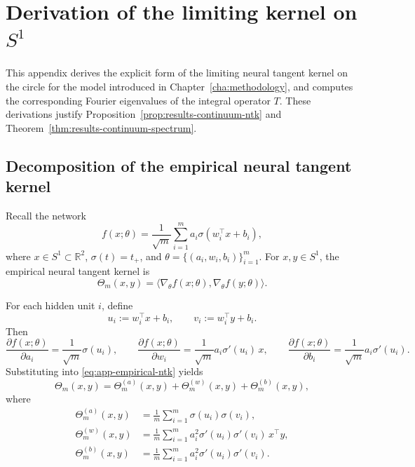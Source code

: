 \chapter{Derivation of the limiting kernel on \(S^1\)}
\label{app:continuum-kernel}

This appendix derives the explicit form of the limiting neural tangent kernel on the circle
for the model introduced in Chapter~\ref{cha:methodology}, and computes the corresponding
Fourier eigenvalues of the integral operator \(T\). These derivations justify
Proposition~\ref{prop:results-continuum-ntk} and
Theorem~\ref{thm:results-continuum-spectrum}.

\section{Decomposition of the empirical neural tangent kernel}
\label{sec:app-ntk-decomposition}

Recall the network
\[
	f(x;\theta)=\frac{1}{\sqrt m}\sum_{i=1}^m a_i \sigma(w_i^\top x+b_i),
\]
where \(x\in S^1\subset\mathbb R^2\), \(\sigma(t)=t_+\), and
\(\theta=\{(a_i,w_i,b_i)\}_{i=1}^m\). For \(x,y\in S^1\), the empirical neural tangent kernel is
\begin{equation}
	\Theta_m(x,y)
	=
	\bigl\langle \nabla_\theta f(x;\theta),\nabla_\theta f(y;\theta)\bigr\rangle.
	\label{eq:app-empirical-ntk}
\end{equation}

For each hidden unit \(i\), define
\[
	u_i:=w_i^\top x+b_i,
	\qquad
	v_i:=w_i^\top y+b_i.
\]
Then
\[
	\frac{\partial f(x;\theta)}{\partial a_i}
	=
	\frac{1}{\sqrt m}\sigma(u_i),
	\qquad
	\frac{\partial f(x;\theta)}{\partial w_i}
	=
	\frac{1}{\sqrt m}a_i\sigma'(u_i)\,x,
	\qquad
	\frac{\partial f(x;\theta)}{\partial b_i}
	=
	\frac{1}{\sqrt m}a_i\sigma'(u_i).
\]
Substituting into \eqref{eq:app-empirical-ntk} yields
\begin{equation}
	\Theta_m(x,y)
	=
	\Theta_m^{(a)}(x,y)+\Theta_m^{(w)}(x,y)+\Theta_m^{(b)}(x,y),
	\label{eq:app-ntk-decomposition}
\end{equation}
where
\begin{align*}
	\Theta_m^{(a)}(x,y)
	 & =
	\frac1m\sum_{i=1}^m \sigma(u_i)\sigma(v_i),                   \\
	\Theta_m^{(w)}(x,y)
	 & =
	\frac1m\sum_{i=1}^m a_i^2 \sigma'(u_i)\sigma'(v_i)\,x^\top y, \\
	\Theta_m^{(b)}(x,y)
	 & =
	\frac1m\sum_{i=1}^m a_i^2 \sigma'(u_i)\sigma'(v_i).
\end{align*}

